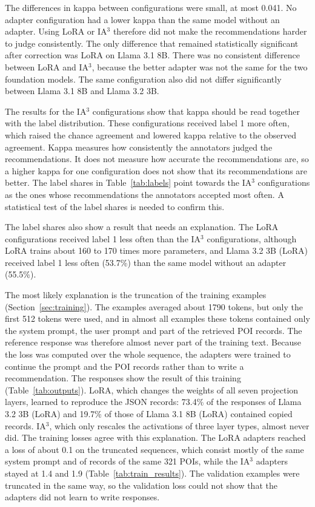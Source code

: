 \documentclass[journal,article,submit,pdftex,moreauthors]{Definitions/mdpi}
\begin{document}
The differences in kappa between configurations were small, at most 0.041. No adapter configuration had a lower kappa than the same model without an adapter. Using LoRA or IA$^3$ therefore did not make the recommendations harder to judge consistently. The only difference that remained statistically significant after correction was LoRA on Llama 3.1 8B. There was no consistent difference between LoRA and IA$^3$, because the better adapter was not the same for the two foundation models. The same configuration also did not differ significantly between Llama 3.1 8B and Llama 3.2 3B.

The results for the IA$^3$ configurations show that kappa should be read together with the label distribution. These configurations received label 1 more often, which raised the chance agreement and lowered kappa relative to the observed agreement. Kappa measures how consistently the annotators judged the recommendations. It does not measure how accurate the recommendations are, so a higher kappa for one configuration does not show that its recommendations are better. The label shares in Table~\ref{tab:labels} point towards the IA$^3$ configurations as the ones whose recommendations the annotators accepted most often. A statistical test of the label shares is needed to confirm this.

The label shares also show a result that needs an explanation. The LoRA configurations received label 1 less often than the IA$^3$ configurations, although LoRA trains about 160 to 170 times more parameters, and Llama 3.2 3B (LoRA) received label 1 less often (53.7\%) than the same model without an adapter (55.5\%).

The most likely explanation is the truncation of the training examples (Section~\ref{sec:training}). The examples averaged about 1790 tokens, but only the first 512 tokens were used, and in almost all examples these tokens contained only the system prompt, the user prompt and part of the retrieved POI records. The reference response was therefore almost never part of the training text. Because the loss was computed over the whole sequence, the adapters were trained to continue the prompt and the POI records rather than to write a recommendation. The responses show the result of this training (Table~\ref{tab:outputs}). LoRA, which changes the weights of all seven projection layers, learned to reproduce the JSON records: 73.4\% of the responses of Llama 3.2 3B (LoRA) and 19.7\% of those of Llama 3.1 8B (LoRA) contained copied records. IA$^3$, which only rescales the activations of three layer types, almost never did. The training losses agree with this explanation. The LoRA adapters reached a loss of about 0.1 on the truncated sequences, which consist mostly of the same system prompt and of records of the same 321 POIs, while the IA$^3$ adapters stayed at 1.4 and 1.9 (Table~\ref{tab:train_results}). The validation examples were truncated in the same way, so the validation loss could not show that the adapters did not learn to write responses.
\end{document}
